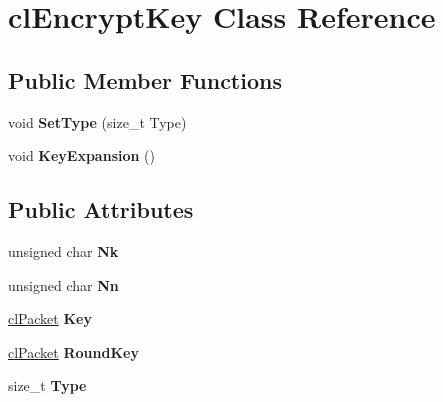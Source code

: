 \hypertarget{classcl_encrypt_key}{
\section{clEncryptKey Class Reference}
\label{classcl_encrypt_key}
}
\subsection*{Public Member Functions}
\begin{DoxyCompactItemize}
\item 
\hypertarget{classcl_encrypt_key_a060e618320ec2a7af385258c26414a61}{
void {\bfseries SetType} (size\_\-t Type)}
\label{classcl_encrypt_key_a060e618320ec2a7af385258c26414a61}

\item 
\hypertarget{classcl_encrypt_key_a4a1f2e95c4b68c3ae99850885ca7d8e3}{
void {\bfseries KeyExpansion} ()}
\label{classcl_encrypt_key_a4a1f2e95c4b68c3ae99850885ca7d8e3}

\end{DoxyCompactItemize}
\subsection*{Public Attributes}
\begin{DoxyCompactItemize}
\item 
\hypertarget{classcl_encrypt_key_aeb07812064e074f6003477d35972bcfd}{
unsigned char {\bfseries Nk}}
\label{classcl_encrypt_key_aeb07812064e074f6003477d35972bcfd}

\item 
\hypertarget{classcl_encrypt_key_a3802a26c346e193f065a8e15da7a3594}{
unsigned char {\bfseries Nn}}
\label{classcl_encrypt_key_a3802a26c346e193f065a8e15da7a3594}

\item 
\hypertarget{classcl_encrypt_key_a926f4fa8f22ad1bf71cedb0f1fe8deb2}{
\hyperlink{classcl_packet}{clPacket} {\bfseries Key}}
\label{classcl_encrypt_key_a926f4fa8f22ad1bf71cedb0f1fe8deb2}

\item 
\hypertarget{classcl_encrypt_key_a19dcc2c7031c0254870a4a9b4f219068}{
\hyperlink{classcl_packet}{clPacket} {\bfseries RoundKey}}
\label{classcl_encrypt_key_a19dcc2c7031c0254870a4a9b4f219068}

\item 
\hypertarget{classcl_encrypt_key_a0024dee61334504bdfcd43d1d18e0e0a}{
size\_\-t {\bfseries Type}}
\label{classcl_encrypt_key_a0024dee61334504bdfcd43d1d18e0e0a}

\end{DoxyCompactItemize}
